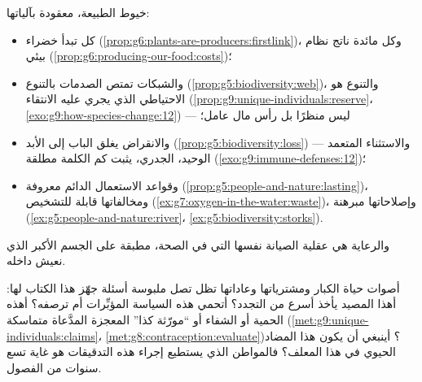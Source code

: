 \begin{proposition}\label{prop:g9:our-responsibility:stewardship}
خيوط الطبيعة، معقودة بآلياتها:
\begin{itemize}
  \item كل  تبدأ خضراء
        (\cref{prop:g6:plants-are-producers:firstlink})،
        وكل مائدة ناتج نظام بيئي
        (\cref{prop:g6:producing-our-food:costs})؛
  \item والشبكات تمتص الصدمات بالتنوع
        (\cref{prop:g5:biodiversity:web})، والتنوع هو
        الاحتياطي الذي يجري عليه الانتقاء
        (\cref{prop:g9:unique-individuals:reserve}،
        \cref{exo:g9:how-species-change:12}) ---
         ليس منظرًا بل رأس مال عامل؛
  \item والانقراض يغلق الباب إلى الأبد
        (\cref{prop:g5:biodiversity:loss}) ---
        والاستثناء المتعمد الوحيد، الجدري، يثبت كم
        الكلمة مطلقة
        (\cref{exo:g9:immune-defenses:12})؛
  \item وقواعد الاستعمال الدائم معروفة
        (\cref{prop:g5:people-and-nature:lasting})،
        ومخالفاتها قابلة للتشخيص
        (\cref{ex:g7:oxygen-in-the-water:waste})،
        وإصلاحاتها مبرهنة
        (\cref{ex:g5:people-and-nature:river}،
        \cref{ex:g5:biodiversity:storks}).
\end{itemize}
والرعاية هي عقلية الصيانة نفسها التي في الصحة، مطبقة على
الجسم الأكبر الذي نعيش داخله.
\end{proposition}
\admitted

\begin{example}\label{ex:g9:our-responsibility:citizen}
أصوات حياة الكبار ومشترياتها وعاداتها تظل تصل ملبوسة
أسئلة جهّز هذا الكتاب لها: أهذا المصيد يأخذ أسرع من
التجدد؟ أتحمي هذه السياسة  المؤبِّرات أم ترصفه؟ أهذه
الحمية أو الشفاء أو ``مورّثة كذا'' المعجزة المدَّعاة
متماسكة (\cref{met:g9:unique-individuals:claims}،
\cref{met:g8:contraception:evaluate})؟ أينبغي أن يكون
هذا المضاد الحيوي في هذا المعلف؟ فالمواطن الذي يستطيع
إجراء هذه التدقيقات هو غاية تسع سنوات من الفصول.
\end{example}

